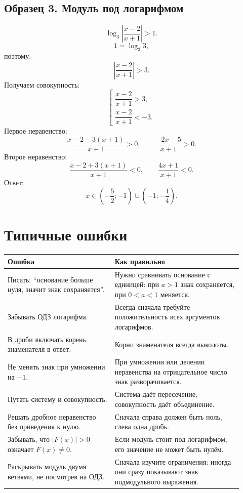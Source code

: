 \documentclass[a4paper,12pt]{article}
\begin{document}
\subsection*{Образец 3. Модуль под логарифмом}

\[
    \log_3\left|\frac{x-2}{x+1}\right|>1.
\]
\[
    1=\log_3 3,
\]
поэтому:
\[
    \left|\frac{x-2}{x+1}\right|>3.
\]
Получаем совокупность:
\[
    \left[
    \begin{array}{l}
    \dfrac{x-2}{x+1}>3,\\[0.5em]
    \dfrac{x-2}{x+1}<-3.
    \end{array}
    \right.
\]
Первое неравенство:
\[
    \frac{x-2-3(x+1)}{x+1}>0,
    \qquad
    \frac{-2x-5}{x+1}>0.
\]
Второе неравенство:
\[
    \frac{x-2+3(x+1)}{x+1}<0,
    \qquad
    \frac{4x+1}{x+1}<0.
\]
Ответ:
\[
    x\in \left(-\frac52;-1\right)\cup
    \left(-1;-\frac14\right).
\]

\section{Типичные ошибки}

\begin{longtable}{>{\raggedright\arraybackslash}p{0.42\linewidth}>{\raggedright\arraybackslash}p{0.50\linewidth}}
\toprule
\textbf{Ошибка} & \textbf{Как правильно} \\
\midrule
Писать: ``основание больше нуля, значит знак сохраняется''. &
Нужно сравнивать основание с единицей: при \(a>1\) знак сохраняется, при \(0<a<1\) меняется. \\
\addlinespace
Забывать ОДЗ логарифма. &
Всегда сначала требуйте положительность всех аргументов логарифмов. \\
\addlinespace
В дроби включать корень знаменателя в ответ. &
Корни знаменателя всегда выколоты. \\
\addlinespace
Не менять знак при умножении на \(-1\). &
При умножении или делении неравенства на отрицательное число знак разворачивается. \\
\addlinespace
Путать систему и совокупность. &
Система даёт пересечение, совокупность даёт объединение. \\
\addlinespace
Решать дробное неравенство без приведения к нулю. &
Сначала справа должен быть ноль, слева одна дробь. \\
\addlinespace
Забывать, что \(|F(x)|>0\) означает \(F(x)\ne 0\). &
Если модуль стоит под логарифмом, его значение не может быть нулём. \\
\addlinespace
Раскрывать модуль двумя ветвями, не посмотрев на ОДЗ. &
Сначала изучите ограничения: иногда они сразу показывают знак подмодульного выражения. \\
\bottomrule
\end{longtable}
\end{document}
